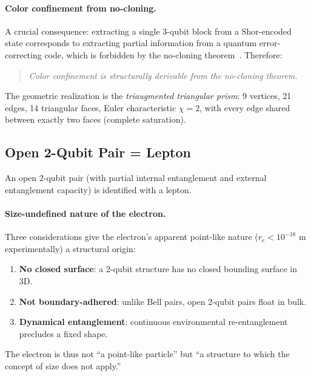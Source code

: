 \documentclass[11pt,a4paper]{article}
\begin{document}
\paragraph{Color confinement from no-cloning.}
A crucial consequence: extracting a single 3-qubit block from a Shor-encoded state corresponds to extracting partial information from a quantum error-correcting code, which is forbidden by the no-cloning theorem~\cite{Wootters1982}. Therefore:
\begin{quote}
\textit{Color confinement is structurally derivable from the no-cloning theorem.}
\end{quote}

The geometric realization is the \emph{triaugmented triangular prism}: 9 vertices, 21 edges, 14 triangular faces, Euler characteristic $\chi = 2$, with every edge shared between exactly two faces (complete saturation).

\subsection{Open 2-Qubit Pair = Lepton}

An open 2-qubit pair (with partial internal entanglement and external entanglement capacity) is identified with a lepton.

\paragraph{Size-undefined nature of the electron.}
Three considerations give the electron's apparent point-like nature ($r_e < 10^{-18}$ m experimentally) a structural origin:
\begin{enumerate}[leftmargin=*]
\item \textbf{No closed surface}: a 2-qubit structure has no closed bounding surface in 3D.
\item \textbf{Not boundary-adhered}: unlike Bell pairs, open 2-qubit pairs float in bulk.
\item \textbf{Dynamical entanglement}: continuous environmental re-entanglement precludes a fixed shape.
\end{enumerate}

The electron is thus not ``a point-like particle'' but ``a structure to which the concept of size does not apply.''
\end{document}
